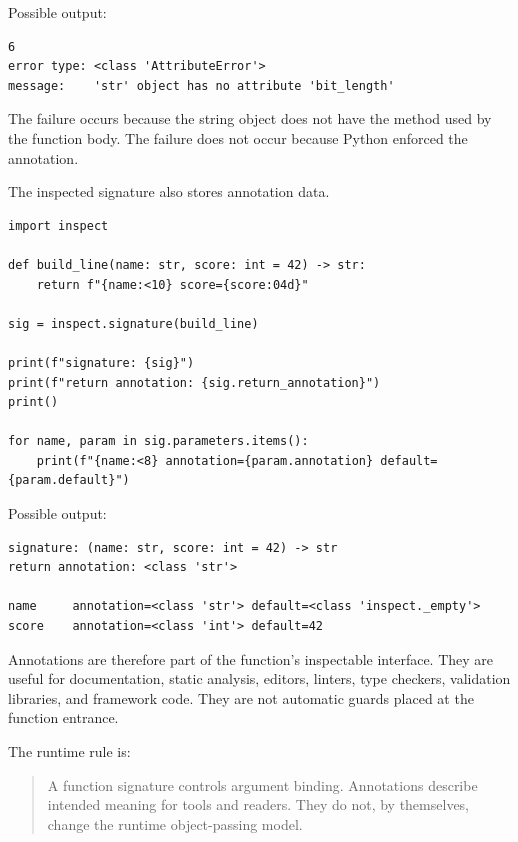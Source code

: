 Possible output:

\begin{verbatim}
6
error type: <class 'AttributeError'>
message:    'str' object has no attribute 'bit_length'
\end{verbatim}

The failure occurs because the string object does not have the method used by the function body. The failure does not occur because Python enforced the annotation.

The inspected signature also stores annotation data.

\begin{verbatim}
import inspect

def build_line(name: str, score: int = 42) -> str:
    return f"{name:<10} score={score:04d}"

sig = inspect.signature(build_line)

print(f"signature: {sig}")
print(f"return annotation: {sig.return_annotation}")
print()

for name, param in sig.parameters.items():
    print(f"{name:<8} annotation={param.annotation} default={param.default}")
\end{verbatim}

Possible output:

\begin{verbatim}
signature: (name: str, score: int = 42) -> str
return annotation: <class 'str'>

name     annotation=<class 'str'> default=<class 'inspect._empty'>
score    annotation=<class 'int'> default=42
\end{verbatim}

Annotations are therefore part of the function's inspectable interface. They are useful for documentation, static analysis, editors, linters, type checkers, validation libraries, and framework code. They are not automatic guards placed at the function entrance.

The runtime rule is:

\begin{quote}
A function signature controls argument binding. Annotations describe intended meaning for tools and readers. They do not, by themselves, change the runtime object-passing model.
\end{quote}
